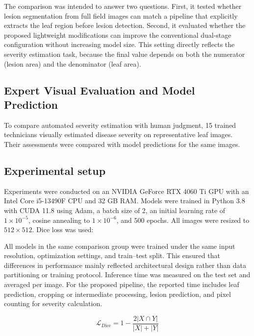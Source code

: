 \documentclass[
]{article}
\begin{document}
The comparison was intended to answer two questions. First, it tested
whether lesion segmentation from full field images can match a pipeline
that explicitly extracts the leaf region before lesion detection.
Second, it evaluated whether the proposed lightweight modifications can
improve the conventional dual-stage configuration without increasing
model size. This setting directly reflects the severity estimation task,
because the final value depends on both the numerator (lesion area) and
the denominator (leaf area).

\hypertarget{expert-visual-evaluation-and-model-prediction}{%
\subsection{Expert Visual Evaluation and Model
Prediction}\label{expert-visual-evaluation-and-model-prediction}}

To compare automated severity estimation with human judgment, 15 trained
technicians visually estimated disease severity on representative leaf
images. Their assessments were compared with model predictions for the
same images.

\hypertarget{experimental-setup}{%
\subsection{Experimental setup}\label{experimental-setup}}

Experiments were conducted on an NVIDIA GeForce RTX 4060 Ti GPU with an
Intel Core i5-13490F CPU and 32 GB RAM. Models were trained in Python 3.8
with CUDA 11.8 using Adam, a batch size of 2, an initial learning rate of
\(1 \times 10^{-5}\), cosine annealing to \(1 \times 10^{-6}\), and 500
epochs. All images were resized to \(512 \times 512\). Dice loss was used:

All models in the same comparison group were trained under the same
input resolution, optimization settings, and train--test split. This
ensured that differences in performance mainly reflected architectural
design rather than data partitioning or training protocol. Inference time
was measured on the test set and averaged per image. For the proposed
pipeline, the reported time includes leaf prediction, cropping or
intermediate processing, lesion prediction, and pixel counting for
severity calculation.

\begin{equation}
\mathcal{L}_{D\text{ice}} = 1 - \frac{2|X \cap Y|}{\left| X \right| + |Y|}
\tag{1}
\end{equation}
\end{document}
